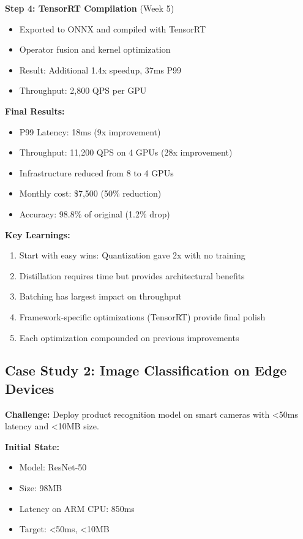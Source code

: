 \textbf{Step 4: TensorRT Compilation} (Week 5)
\begin{itemize}
    \item Exported to ONNX and compiled with TensorRT
    \item Operator fusion and kernel optimization
    \item Result: Additional 1.4x speedup, 37ms P99
    \item Throughput: 2,800 QPS per GPU
\end{itemize}

\textbf{Final Results:}
\begin{itemize}
    \item P99 Latency: 18ms (9x improvement)
    \item Throughput: 11,200 QPS on 4 GPUs (28x improvement)
    \item Infrastructure reduced from 8 to 4 GPUs
    \item Monthly cost: \$7,500 (50\% reduction)
    \item Accuracy: 98.8\% of original (1.2\% drop)
\end{itemize}

\textbf{Key Learnings:}
\begin{enumerate}
    \item Start with easy wins: Quantization gave 2x with no training
    \item Distillation requires time but provides architectural benefits
    \item Batching has largest impact on throughput
    \item Framework-specific optimizations (TensorRT) provide final polish
    \item Each optimization compounded on previous improvements
\end{enumerate}

\subsection{Case Study 2: Image Classification on Edge Devices}

\textbf{Challenge:} Deploy product recognition model on smart cameras with <50ms latency and <10MB size.

\textbf{Initial State:}
\begin{itemize}
    \item Model: ResNet-50
    \item Size: 98MB
    \item Latency on ARM CPU: 850ms
    \item Target: <50ms, <10MB
\end{itemize}

